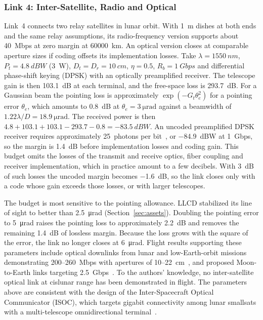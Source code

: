 \documentclass{IEEEoj}
\begin{document}
\subsubsection{Link 4: Inter-Satellite, Radio and Optical}
\label{sec:link4}
Link~4 connects two relay satellites in lunar orbit. With \SI{1}{m} dishes at both ends and the same relay assumptions, its radio-frequency version supports about \SI{40}{Mbps} at zero margin at \SI{60000}{km}. An optical version closes at comparable aperture sizes if coding offsets its implementation losses. Take $\lambda = \SI{1550}{nm}$, $P_t = \SI{+4.8}{dBW}$ (\SI{3}{W}), $D_t = D_r = \SI{10}{cm}$, $\eta = 0.5$, $R_b = \SI{1}{Gbps}$ and differential phase-shift keying (DPSK) with an optically preamplified receiver. The telescope gain is then \SI{103.1}{dB} at each terminal, and the free-space loss is \SI{293.7}{dB}. For a Gaussian beam the pointing loss is approximately $\exp(-G_t\theta_e^2)$ for a pointing error $\theta_e$, which amounts to \SI{0.8}{dB} at $\theta_e = \SI{3}{\micro\radian}$ against a beamwidth of $1.22\lambda/D = \SI{18.9}{\micro\radian}$. The received power is then $4.8 + 103.1 + 103.1 - 293.7 - 0.8 = \SI{-83.5}{dBW}$. An uncoded preamplified DPSK receiver requires approximately 25~photons per bit~\cite{caplan_laser_comm}, or \SI{-84.9}{dBW} at \SI{1}{Gbps}, so the margin is \SI{1.4}{dB} before implementation losses and coding gain. This budget omits the losses of the transmit and receive optics, fiber coupling and receiver implementation, which in practice amount to a few decibels. With \SI{3}{dB} of such losses the uncoded margin becomes \SI{-1.6}{dB}, so the link closes only with a code whose gain exceeds those losses, or with larger telescopes.

The budget is most sensitive to the pointing allowance. LLCD stabilized its line of sight to better than \SI{2.5}{\micro\radian} (Section~\ref{sec:assets}). Doubling the pointing error to \SI{5}{\micro\radian} raises the pointing loss to approximately \SI{2.2}{dB} and removes the remaining \SI{1.4}{dB} of lossless margin. Because the loss grows with the square of the error, the link no longer closes at \SI{6}{\micro\radian}. Flight results supporting these parameters include optical downlinks from lunar and low-Earth-orbit missions demonstrating \SI{200}{}--\SI{260}{Mbps} with apertures of \SI{10}{}--\SI{22}{cm}~\cite{nasa_o2o,tbird_optical}, and proposed Moon-to-Earth links targeting \SI{2.5}{Gbps}~\cite{jaxa_optical_relay}. To the authors' knowledge, no inter-satellite optical link at cislunar range has been demonstrated in flight. The parameters above are consistent with the design of the Inter-Spacecraft Optical Communicator (ISOC), which targets gigabit connectivity among lunar smallsats with a multi-telescope omnidirectional terminal~\cite{isoc_2026}.
\end{document}
